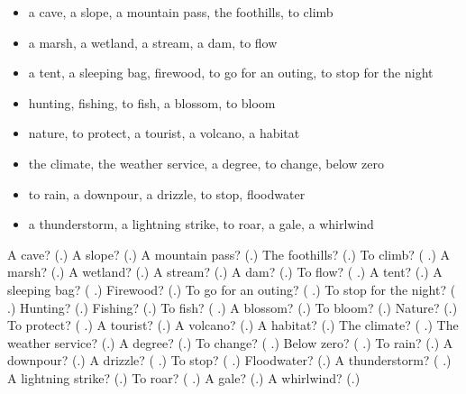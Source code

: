 \begin{itemize}
\raggedright
  \item a cave, a slope, a mountain pass, the foothills, to climb
  \item a marsh, a wetland, a stream, a dam, to flow
  \item a tent, a sleeping bag, firewood, to go for an outing, to stop for the night
  \item hunting, fishing, to fish, a blossom, to bloom
  \item nature, to protect, a tourist, a volcano, a habitat
  \item the climate, the weather service, a degree, to change, below zero
  \item to rain, a downpour, a drizzle, to stop, floodwater
  \item a thunderstorm, a lightning strike, to roar, a gale, a whirlwind
\end{itemize}

\begin{tcolorbox}[breakable,colback=teal!4,colframe=teal!35!black,title={Before you move on}]
A cave? (\textbf{}.) A slope? (\textbf{}.) A mountain pass? (\textbf{}.) The foothills? (\textbf{}.) To climb? (\textbf{ }.) A marsh? (\textbf{}.) A wetland? (\textbf{}.) A stream? (\textbf{}.) A dam? (\textbf{}.) To flow? (\textbf{ }.) A tent? (\textbf{}.) A sleeping bag? (\textbf{ }.) Firewood? (\textbf{}.) To go for an outing? (\textbf{ }.) To stop for the night? (\textbf{ }.) Hunting? (\textbf{}.) Fishing? (\textbf{}.) To fish? (\textbf{ }.) A blossom? (\textbf{}.) To bloom? (\textbf{}.) Nature? (\textbf{}.) To protect? (\textbf{ }.) A tourist? (\textbf{}.) A volcano? (\textbf{}.) A habitat? (\textbf{}.) The climate? (\textbf{  }.) The weather service? (\textbf{}.) A degree? (\textbf{}.) To change? (\textbf{ }.) Below zero? (\textbf{ }.) To rain? (\textbf{}.) A downpour? (\textbf{}.) A drizzle? (\textbf{ }.) To stop? (\textbf{ }.) Floodwater? (\textbf{}.) A thunderstorm? (\textbf{  }.) A lightning strike? (\textbf{}.) To roar? (\textbf{ }.) A gale? (\textbf{}.) A whirlwind? (\textbf{}.)
\end{tcolorbox}
